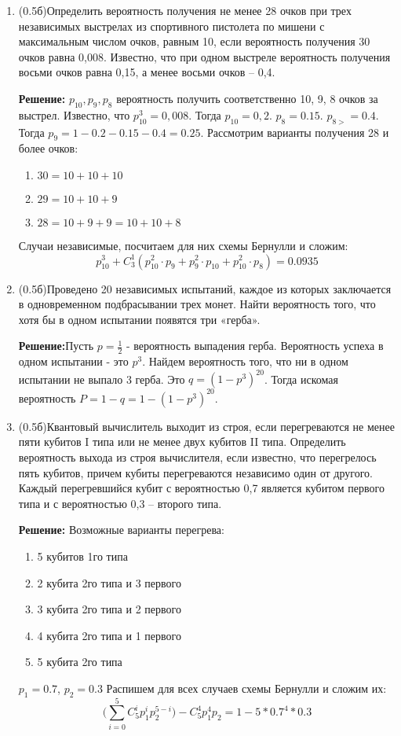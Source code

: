 \documentclass[a4paper, 14pt]{extarticle}
\begin{document}
\begin{enumerate}
\item (0.5б)Определить вероятность получения не менее 28 
	очков при трех независимых выстрелах из спортивного 
	пистолета по мишени с максимальным числом очков, равным 10,
	если вероятность получения 30 очков равна 0,008. Известно,
	что при одном выстреле вероятность получения восьми очков
	равна 0,15, а менее восьми очков -- 0,4.
	
\textbf{Решение:}
$p_{10}, p_{9}, p_{8}$ вероятность получить соответственно 10, 9, 8 очков за выстрел.  Известно, что $p_{10}^3= 0,008$. Тогда $p_{10} = 0,2$. $p_{8} = 0.15$. $p_{8>} = 0.4$. Тогда $p_{9} = 1 - 0.2 - 0.15 - 0.4 = 0.25$. Рассмотрим варианты получения 28 и более очков:
\begin{enumerate}
    \item $30 = 10+10+10$
    \item $29 = 10 + 10 + 9$
    \item $28 = 10+9+9 = 10+10+8$
\end{enumerate}
Случаи независимые, посчитаем для них схемы Бернулли и сложим:
$$p_{10}^3 + C_3^1(p_{10}^2\cdot p_{9} + p_{9}^2\cdot p_{10} + p_{10}^2\cdot p_{8}) = 0.0935$$


\item (0.5б)Проведено 20 независимых испытаний, каждое
	из которых заключается в одновременном 
	подбрасывании трех монет. Найти вероятность того, что хотя бы в одном испытании появятся три «герба».
	
\textbf{Решение:}Пусть $p=\frac{1}{2}$ - вероятность выпадения герба. Вероятность успеха в одном испытании - это $p^3$. Найдем вероятность того, что ни в одном испытании не выпало 3 герба. Это $q = (1 - p^3)^{20}$. Тогда искомая вероятность $P = 1 - q = 1 - (1 - p^3)^{20}$.

\item (0.5б)Квантовый вычислитель  выходит из строя, если перегреваются не менее пяти кубитов I типа или не менее двух кубитов II типа. Определить вероятность выхода из строя вычислителя, если известно, что перегрелось пять кубитов, причем кубиты перегреваются независимо один от другого. Каждый перегревшийся кубит с вероятностью 0,7 является кубитом первого типа и с вероятностью 0,3 -- второго типа.
	
\textbf{Решение:} Возможные варианты перегрева:
\begin{enumerate}
\item 5 кубитов 1го типа
\item 2 кубита 2го типа и 3 первого
\item 3 кубита 2го типа и 2 первого
\item 4 кубита 2го типа и 1 первого
\item 5 кубита 2го типа
\end{enumerate}
$p_1 = 0.7$, $p_2=0.3$ Распишем для всех случаев схемы Бернулли и сложим их:
$$\big(\sum_{i=0}^{5}C_5^i p_1^i p_2^{5-i} \big) - C_5^4p_1^4p_2 = 1 - 5*0.7^4*0.3$$


\end{enumerate}
\end{document}
